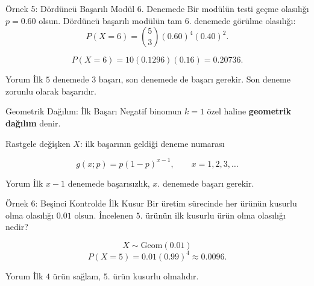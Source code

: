 \documentclass[light]{lutbeamer}
\begin{document}
\begin{frame}{Örnek 5: Dördüncü Başarılı Modül 6. Denemede}
    \small
    Bir modülün testi geçme olasılığı \(p=0.60\) olsun. Dördüncü başarılı modülün tam \(6\). denemede görülme olasılığı:
    \[
    P(X=6)=\binom{5}{3}(0.60)^4(0.40)^2.
    \]

    \[
    P(X=6)=10(0.1296)(0.16)=0.20736.
    \]

    \begin{exampleblock}{Yorum}
        İlk \(5\) denemede \(3\) başarı, son denemede de başarı gerekir. Son deneme zorunlu olarak başarıdır.
    \end{exampleblock}
\end{frame}

\begin{frame}{Geometrik Dağılım: İlk Başarı}
    \small
    Negatif binomun \(k=1\) özel haline \textbf{geometrik dağılım} denir.

    \begin{block}{Rastgele değişken}
        \(X\): ilk başarının geldiği deneme numarası
    \end{block}

    \[
    g(x;p)=p(1-p)^{x-1}, \qquad x=1,2,3,\dots
    \]

    \begin{exampleblock}{Yorum}
        İlk \(x-1\) denemede başarısızlık, \(x\). denemede başarı gerekir.
    \end{exampleblock}
\end{frame}

\begin{frame}{Örnek 6: Beşinci Kontrolde İlk Kusur}
    \small
    Bir üretim sürecinde her ürünün kusurlu olma olasılığı \(0.01\) olsun. İncelenen \(5\). ürünün ilk kusurlu ürün olma olasılığı nedir?

    \[
    X \sim \text{Geom}(0.01)
    \]
    \[
    P(X=5)=0.01(0.99)^4\approx 0.0096.
    \]

    \begin{exampleblock}{Yorum}
        İlk \(4\) ürün sağlam, \(5\). ürün kusurlu olmalıdır.
    \end{exampleblock}
\end{frame}
\end{document}
